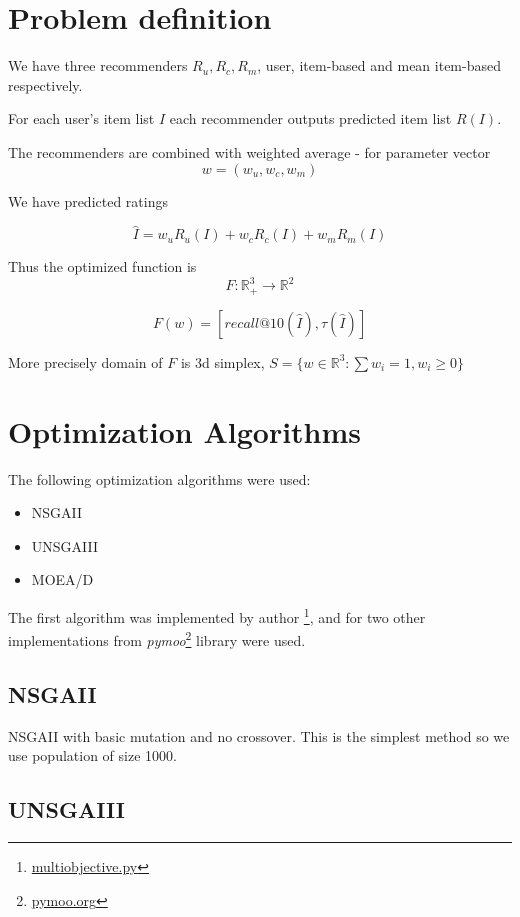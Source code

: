 \documentclass{article}
\begin{document}
\section{Problem definition}

We have three recommenders $R_u, R_c, R_m$, user, item-based and mean item-based respectively.

For each user's item list $I$ each recommender outputs predicted item list $R(I)$.

The recommenders are combined with weighted average - for parameter vector $$w = (w_u, w_c, w_m)$$

We have predicted ratings

$$\hat{I} = w_u R_u(I) + w_c R_c(I) + w_m R_m(I)$$

Thus the optimized function is $$F: \mathbb R^3_+ \to \mathbb R^2$$

$$F(w) = [recall@10(\hat{I}), \tau(\hat{I})]$$

More precisely domain of $F$ is 3d simplex, $S = \{w \in \mathbb{R}^3: \sum w_i = 1, w_i \geq 0\}$

\section{Optimization Algorithms}

The following optimization algorithms were used:


\begin{itemize}
\item NSGAII
\item UNSGAIII
\item MOEA/D
\end{itemize}

The first algorithm was implemented by author \footnote{\href{https://github.com/lambdaofgod/mlutil/blob/master/mlutil/evolutionary_algorithms/multiobjective.py}{multiobjective.py}}, and for two other implementations from \textit{pymoo}\footnote{\href{https://www.pymoo.org/}{pymoo.org}} library were used.

\subsection{NSGAII}

NSGAII with basic mutation and no crossover. This is the simplest method so we use population of size 1000.
\subsection{UNSGAIII}
\end{document}
